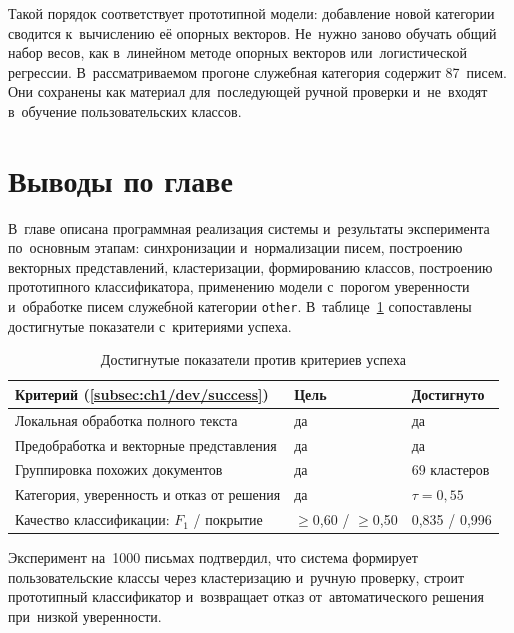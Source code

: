 Такой порядок соответствует прототипной модели: добавление новой категории
сводится к~вычислению её опорных векторов. Не~нужно заново обучать общий набор
весов, как в~линейном методе опорных векторов или~логистической регрессии.
В~рассматриваемом прогоне служебная категория содержит 87~писем. Они сохранены
как материал для~последующей ручной проверки и~не~входят в~обучение
пользовательских классов.

\section{Выводы по главе}\label{sec:ch3/concl}

В~главе описана программная реализация системы и~результаты эксперимента
по~основным этапам: синхронизации и~нормализации писем, построению векторных
представлений, кластеризации, формированию классов, построению прототипного
классификатора, применению модели с~порогом уверенности и~обработке писем
служебной категории \texttt{other}. В~таблице~\ref{tab:ch3/criteria}
сопоставлены достигнутые показатели с~критериями успеха.

\begin{table}[htbp]
    \centering
    \caption{Достигнутые показатели против критериев успеха}\label{tab:ch3/criteria}
    \begin{tabular}{@{}p{}ll@{}}
        \toprule
        Критерий (\ref{subsec:ch1/dev/success}) & Цель & Достигнуто \\
        \midrule
        Локальная обработка полного текста & да & да \\
        Предобработка и векторные представления & да & да \\
        Группировка похожих документов & да & 69 кластеров \\
        Категория, уверенность и отказ от решения & да & \(\tau=0{,}55\) \\
        Качество классификации: \(F_1\) / покрытие & \(\geqslant\)0{,}60 / \(\geqslant\)0{,}50 & 0{,}835 / 0{,}996 \\
        \bottomrule
    \end{tabular}
\end{table}
\FloatBarrier

Эксперимент на~1000 письмах подтвердил, что система формирует пользовательские
классы через кластеризацию и~ручную проверку, строит прототипный классификатор
и~возвращает отказ от~автоматического решения при~низкой уверенности.

\clearpage
